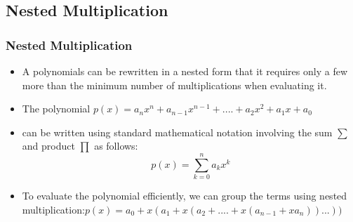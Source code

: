 \documentclass[notheorems,mathserif,table,compress]{beamer}  %
\begin{document}
\subsection{Nested Multiplication}

\begin{frame}
  \frametitle{Nested Multiplication}
  \begin{itemize}
 \item A polynomials can be rewritten in a nested  form  that it  requires  only a few more  than  the minimum  number of multiplications  when  evaluating it.
 \item The polynomial $p(x)=a_nx^n+a_{n-1}x^{n-1}+....+a_2x^2+a_1x+a_0$  
 \item can  be written  using  standard  mathematical  notation involving  the  sum $\sum$ and  product $\prod$ as follows:
 \begin{displaymath}
p(x)=\sum_{k=0}^n a_kx^k 
\end{displaymath}
  \item To evaluate  the  polynomial  efficiently, we can group  the  terms  using  nested  multiplication:$p(x)=a_0+x(a_1+x(a_2+....+x(a_{n-1}+xa_n))...))$
\end{itemize}
\end{frame}

\end{document}

